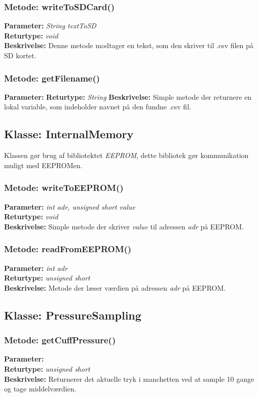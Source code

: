 \subsubsection{Metode: writeToSDCard()}
\textbf{Parameter: } \textit{String textToSD}
\\ \textbf{Returtype: } \textit{void}
\\ \textbf{Beskrivelse: }  Denne metode modtager en tekst, som den skriver til .csv filen på SD kortet.

\subsubsection{Metode: getFilename()}
\textbf{Parameter: }\textit{}
\textbf{Returtype: } \textit{String}
\textbf{Beskrivelse: } Simple metode der returnere en lokal variable, som indeholder navnet på den fundne .csv fil.

\subsection{Klasse: InternalMemory}
Klassen gør brug af bibliotektet \textit{EEPROM}, dette bibliotek gør kommunikation muligt med EEPROMen. 

\subsubsection{Metode: writeToEEPROM()}
\textbf{Parameter: } \textit{int adr, unsigned short value}
\\ \textbf{Returtype: } \textit{void}
\\ \textbf{Beskrivelse: }  Simple metode der skriver \textit{value} til adressen \textit{adr} på EEPROM.

\subsubsection{Metode: readFromEEPROM()}
\textbf{Parameter: } \textit{int adr}
\\ \textbf{Returtype: } \textit{unsigned short}
\\ \textbf{Beskrivelse: }  Metode der læser værdien på adressen \textit{adr} på EEPROM. 

\subsection{Klasse: PressureSampling}

\subsubsection{Metode: getCuffPressure()}
\textbf{Parameter: } 
\\ \textbf{Returtype: } \textit{unsigned short }
\\ \textbf{Beskrivelse: } Returnerer det aktuelle tryk i manchetten ved at sample 10 gange og tage middelværdien.

